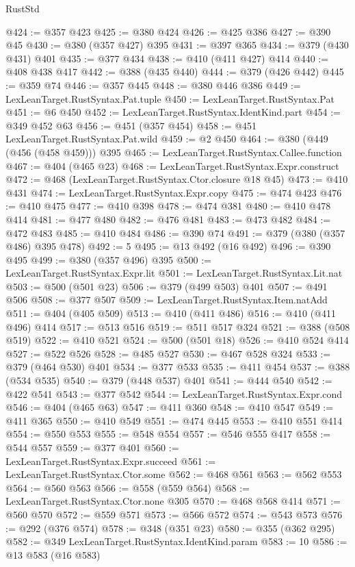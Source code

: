 \begin{lexlean}{RustStd}
\begin{coremodule}
@424 := @357 @423
@425 := @380 @424
@426 := @425 @386
@427 := @390 @45
@430 := @380 (@357 @427) @395
@431 := @397 @365
@434 := @379 (@430 @431) @401
@435 := @377 @434
@438 := @410 (@411 @427) @414
@440 := @408 @438 @417
@442 := @388 (@435 @440)
@444 := @379 (@426 @442)
@445 := @359 @74
@446 := @357 @445
@448 := @380 @446 @386
@449 := LexLeanTarget.RustSyntax.Pat.tuple
@450 := LexLeanTarget.RustSyntax.Pat
@451 := @6 @450
@452 := LexLeanTarget.RustSyntax.IdentKind.part
@454 := @349 @452 @63
@456 := @451 (@357 @454)
@458 := @451 LexLeanTarget.RustSyntax.Pat.wild
@459 := @2 @450
@464 := @380 (@449 (@456 (@458 @459))) @395
@465 := LexLeanTarget.RustSyntax.Callee.function
@467 := @404 (@465 @23)
@468 := LexLeanTarget.RustSyntax.Expr.construct
@472 := @468 (LexLeanTarget.RustSyntax.Ctor.closure @18 @45)
@473 := @410 @431
@474 := LexLeanTarget.RustSyntax.Expr.copy
@475 := @474 @423
@476 := @410 @475
@477 := @410 @398
@478 := @474 @381
@480 := @410 @478 @414
@481 := @477 @480
@482 := @476 @481
@483 := @473 @482
@484 := @472 @483
@485 := @410 @484
@486 := @390 @74
@491 := @379 (@380 (@357 @486) @395 @478)
@492 := 5
@495 := @13 @492 (@16 @492)
@496 := @390 @495
@499 := @380 (@357 @496) @395
@500 := LexLeanTarget.RustSyntax.Expr.lit
@501 := LexLeanTarget.RustSyntax.Lit.nat
@503 := @500 (@501 @23)
@506 := @379 (@499 @503) @401
@507 := @491 @506
@508 := @377 @507
@509 := LexLeanTarget.RustSyntax.Item.natAdd
@511 := @404 (@405 @509)
@513 := @410 (@411 @486)
@516 := @410 (@411 @496) @414
@517 := @513 @516
@519 := @511 @517 @324
@521 := @388 (@508 @519)
@522 := @410 @521
@524 := @500 (@501 @18)
@526 := @410 @524 @414
@527 := @522 @526
@528 := @485 @527
@530 := @467 @528 @324
@533 := @379 (@464 @530) @401
@534 := @377 @533
@535 := @411 @454
@537 := @388 (@534 @535)
@540 := @379 (@448 @537) @401
@541 := @444 @540
@542 := @422 @541
@543 := @377 @542
@544 := LexLeanTarget.RustSyntax.Expr.cond
@546 := @404 (@465 @63)
@547 := @411 @360
@548 := @410 @547
@549 := @411 @365
@550 := @410 @549
@551 := @474 @445
@553 := @410 @551 @414
@554 := @550 @553
@555 := @548 @554
@557 := @546 @555 @417
@558 := @544 @557
@559 := @377 @401
@560 := LexLeanTarget.RustSyntax.Expr.succeed
@561 := LexLeanTarget.RustSyntax.Ctor.some
@562 := @468 @561
@563 := @562 @553
@564 := @560 @563
@566 := @558 (@559 @564)
@568 := LexLeanTarget.RustSyntax.Ctor.none @305
@570 := @468 @568 @414
@571 := @560 @570
@572 := @559 @571
@573 := @566 @572
@574 := @543 @573
@576 := @292 (@376 @574)
@578 := @348 (@351 @23)
@580 := @355 (@362 @295)
@582 := @349 LexLeanTarget.RustSyntax.IdentKind.param
@583 := 10
@586 := @13 @583 (@16 @583)

\end{coremodule}
\end{lexlean}
